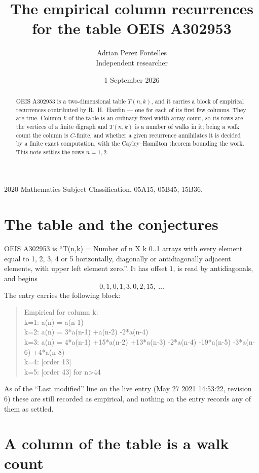 \documentclass[11pt,a4paper]{article}
\title{The empirical column recurrences for the table OEIS A302953}
\author{Adrian Perez Fontelles\\ \small Independent researcher}
\date{1 September 2026}
\theoremstyle{plain}
\theoremstyle{definition}
\begin{document}
\maketitle

\begin{abstract}
OEIS A302953 is a two-dimensional table $T(n,k)$, and it carries a block of empirical
recurrences contributed by R.~H.~Hardin --- one for each of its first few columns. They are
true. Column $k$ of the table is an ordinary fixed-width array count, so its rows are the
vertices of a finite digraph and $T(n,k)$ is a number of walks in it; being a walk count the
column is $C$-finite, and whether a given recurrence annihilates it is decided by a finite
exact computation, with the Cayley--Hamilton theorem bounding the work. This note settles the rows $n=1, 2$.
\end{abstract}

\noindent\small 2020 Mathematics Subject Classification. 05A15, 05B45, 15B36.\normalsize

\section{The table and the conjectures}

OEIS A302953 is ``T(n,k) = Number of n X k 0..1 arrays with every element equal to 1, 2, 3, 4 or 5 horizontally, diagonally or antidiagonally adjacent elements, with upper left element zero.''. It has offset $1$, is
read by antidiagonals, and begins
\[
0, 1, 0, 1, 3, 0, 2, 15,\ \dots
\]
The entry carries the following block:
\begin{quote}\small
Empirical for column k:\\
k=1: a(n) = a(n-1)\\
k=2: a(n) = 3*a(n-1) +a(n-2) -2*a(n-4)\\
k=3: a(n) = 4*a(n-1) +15*a(n-2) +13*a(n-3) -2*a(n-4) -19*a(n-5) -3*a(n-6) +4*a(n-8)\\
k=4: [order 13]\\
k=5: [order 43] for n>44\\
\end{quote}
As of the ``Last modified'' line on the live entry (May 27 2021 14:53:22, revision 6) these are still
recorded as empirical, and nothing on the entry records any of them as settled.

\section{A column of the table is a walk count}
\end{document}
